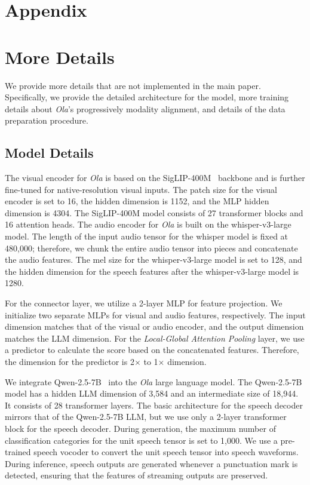 \appendix
\section*{Appendix}

\section{More Details}

We provide more details that are not implemented in the main paper. Specifically, we provide the detailed architecture for the model, more training details about \textit{Ola}'s progressively modality alignment, and details of the data preparation procedure. 

\subsection{Model Details}

The visual encoder for \textit{Ola} is based on the SigLIP-400M~\citep{zhai2023siglip} backbone and is further fine-tuned for native-resolution visual inputs. The patch size for the visual encoder is set to 16, the hidden dimension is 1152, and the MLP hidden dimension is 4304. The SigLIP-400M model consists of 27 transformer blocks and 16 attention heads. The audio encoder for \textit{Ola} is built on the whisper-v3-large~\citep{radford2022whisper} model. The length of the input audio tensor for the whisper model is fixed at 480,000; therefore, we chunk the entire audio tensor into pieces and concatenate the audio features. The mel size for the whisper-v3-large model is set to 128, and the hidden dimension for the speech features after the whisper-v3-large model is 1280.

For the connector layer, we utilize a 2-layer MLP for feature projection. We initialize two separate MLPs for visual and audio features, respectively. The input dimension matches that of the visual or audio encoder, and the output dimension matches the LLM dimension. For the \textit{Local-Global Attention Pooling} layer, we use a predictor to calculate the score based on the concatenated features. Therefore, the dimension for the predictor is 2$\times$ to 1$\times$ dimension.

We integrate Qwen-2.5-7B~\citep{qwen2.5} into the \textit{Ola} large language model. The Qwen-2.5-7B model has a hidden LLM dimension of 3,584 and an intermediate size of 18,944. It consists of 28 transformer layers. The basic architecture for the speech decoder mirrors that of the Qwen-2.5-7B LLM, but we use only a 2-layer transformer block for the speech decoder. During generation, the maximum number of classification categories for the unit speech tensor is set to 1,000. We use a pre-trained speech vocoder to convert the unit speech tensor into speech waveforms. During inference, speech outputs are generated whenever a punctuation mark is detected, ensuring that the features of streaming outputs are preserved.

